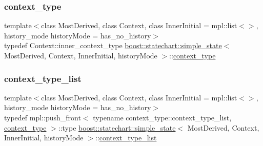 \subsubsection{\texorpdfstring{context\+\_\+type}{context\_type}}
{\footnotesize\ttfamily template$<$class Most\+Derived, class Context, class Inner\+Initial = mpl\+::list$<$$>$, history\+\_\+mode history\+Mode = has\+\_\+no\+\_\+history$>$ \\
typedef Context\+::inner\+\_\+context\+\_\+type \mbox{\hyperlink{classboost_1_1statechart_1_1simple__state}{boost\+::statechart\+::simple\+\_\+state}}$<$ Most\+Derived, Context, Inner\+Initial, history\+Mode $>$\+::\mbox{\hyperlink{classboost_1_1statechart_1_1simple__state_ac053eaa9e1b0e3ccbf2231786cd651c4}{context\+\_\+type}}}

\mbox{\label{classboost_1_1statechart_1_1simple__state_acb5e762119ffe2d44516c0f812d6cb65}} 
\subsubsection{\texorpdfstring{context\+\_\+type\+\_\+list}{context\_type\_list}}
{\footnotesize\ttfamily template$<$class Most\+Derived, class Context, class Inner\+Initial = mpl\+::list$<$$>$, history\+\_\+mode history\+Mode = has\+\_\+no\+\_\+history$>$ \\
typedef mpl\+::push\+\_\+front$<$ typename context\+\_\+type\+::context\+\_\+type\+\_\+list, \mbox{\hyperlink{classboost_1_1statechart_1_1simple__state_ac053eaa9e1b0e3ccbf2231786cd651c4}{context\+\_\+type}} $>$\+::type \mbox{\hyperlink{classboost_1_1statechart_1_1simple__state}{boost\+::statechart\+::simple\+\_\+state}}$<$ Most\+Derived, Context, Inner\+Initial, history\+Mode $>$\+::\mbox{\hyperlink{classboost_1_1statechart_1_1simple__state_acb5e762119ffe2d44516c0f812d6cb65}{context\+\_\+type\+\_\+list}}}

\mbox{\label{classboost_1_1statechart_1_1simple__state_a2e6aa9f4912c70a9dbef800845044bc7}} 
